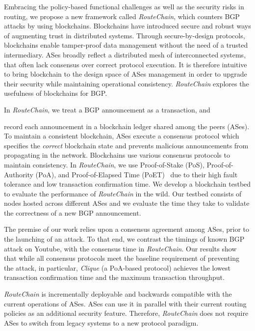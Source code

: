 \documentclass[5p]{elsarticle}
\newcommand{\rc}{{{\em RouteChain}}\xspace}
\begin{document}

Embracing the policy-based functional challenges as well as the security risks in routing, we propose a new framework called \rc, which counters BGP attacks by using blockchains. Blockchains have introduced secure and robust ways of augmenting trust in distributed systems. Through secure-by-design protocols, blockchains enable tamper-proof data management without the need of a trusted intermediary. ASes broadly reflect a distributed mesh of interconnected systems, that often lack consensus over correct protocol execution. It is therefore intuitive to bring blockchain to the design space of ASes management in order to upgrade their security while maintaining operational consistency. \rc explores the usefulness of blockchains for BGP. 

In \rc, we treat a BGP announcement as a transaction, and {\color{blue} record each announcement in a blockchain ledger shared among the peers (ASes). To maintain a consistent blockchain, ASes execute a consensus protocol which specifies the {\em correct} blockchain state and prevents malicious announcements from propagating in the network. Blockchains use various consensus protocols to maintain consistency. In \rc, we use Proof-of-Stake (PoS), Proof-of-Authority (PoA), and Proof-of-Elapsed Time (PoET)~\cite{BanoSAAMMD17,Angelis18,SaadSNKSNM20} due to their high fault tolerance and low transaction confirmation time. We develop a blockchain testbed to evaluate the performance of \rc in the wild. Our testbed consists of nodes hosted across different ASes and we evaluate the time they take to validate the correctness of a new BGP announcement. 





The premise of our work relies upon a consensus agreement among ASes, prior to the launching of an attack. To that end, we contrast the timings of known BGP attack on Youtube, with the consensus time in \rc. Our results show that while all consensus protocols meet the baseline requirement of preventing the attack, in particular, {\em Clique} (a PoA-based protocol) achieves the lowest transaction confirmation time and the maximum transaction throughput.} \rc is incrementally deployable and backwards compatible with the current operations of ASes. ASes can use it in parallel with their current routing policies as an additional security feature. Therefore, \rc does not require ASes to switch from legacy systems to a new protocol paradigm. 
\end{document}
